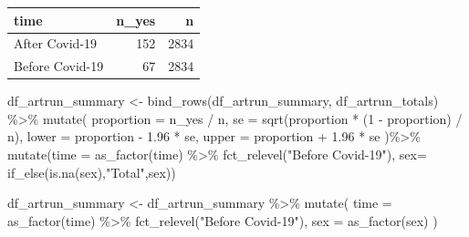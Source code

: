 \documentclass[
  letterpaper,
  DIV=11,
  numbers=noendperiod]{scrartcl}
\newenvironment{Shaded}{\begin{snugshade}}{\end{snugshade}}
\newcommand{\AttributeTok}[1]{\textcolor[rgb]{0.40,0.45,0.13}{#1}}
\newcommand{\DecValTok}[1]{\textcolor[rgb]{0.68,0.00,0.00}{#1}}
\newcommand{\FloatTok}[1]{\textcolor[rgb]{0.68,0.00,0.00}{#1}}
\newcommand{\FunctionTok}[1]{\textcolor[rgb]{0.28,0.35,0.67}{#1}}
\newcommand{\NormalTok}[1]{\textcolor[rgb]{0.00,0.23,0.31}{#1}}
\newcommand{\OtherTok}[1]{\textcolor[rgb]{0.00,0.23,0.31}{#1}}
\newcommand{\SpecialCharTok}[1]{\textcolor[rgb]{0.37,0.37,0.37}{#1}}
\newcommand{\StringTok}[1]{\textcolor[rgb]{0.13,0.47,0.30}{#1}}
\begin{document}
\begin{longtable}[]{@{}lrr@{}}
\toprule\noalign{}
time & n\_yes & n \\
\midrule\noalign{}
\endhead
\bottomrule\noalign{}
\endlastfoot
After Covid-19 & 152 & 2834 \\
Before Covid-19 & 67 & 2834 \\
\end{longtable}

\begin{Shaded}
\begin{Highlighting}[]
\NormalTok{df\_artrun\_summary }\OtherTok{\textless{}{-}} \FunctionTok{bind\_rows}\NormalTok{(df\_artrun\_summary, df\_artrun\_totals) }\SpecialCharTok{\%\textgreater{}\%}
  \FunctionTok{mutate}\NormalTok{(}
    \AttributeTok{proportion =}\NormalTok{ n\_yes }\SpecialCharTok{/}\NormalTok{ n,}
    \AttributeTok{se =} \FunctionTok{sqrt}\NormalTok{(proportion }\SpecialCharTok{*}\NormalTok{ (}\DecValTok{1} \SpecialCharTok{{-}}\NormalTok{ proportion) }\SpecialCharTok{/}\NormalTok{ n),}
    \AttributeTok{lower =}\NormalTok{ proportion }\SpecialCharTok{{-}} \FloatTok{1.96} \SpecialCharTok{*}\NormalTok{ se,}
    \AttributeTok{upper =}\NormalTok{ proportion }\SpecialCharTok{+} \FloatTok{1.96} \SpecialCharTok{*}\NormalTok{ se}
\NormalTok{  )}\SpecialCharTok{\%\textgreater{}\%} 
  \FunctionTok{mutate}\NormalTok{(}\AttributeTok{time =} \FunctionTok{as\_factor}\NormalTok{(time) }\SpecialCharTok{\%\textgreater{}\%} 
           \FunctionTok{fct\_relevel}\NormalTok{(}\StringTok{"Before Covid{-}19"}\NormalTok{),}
        \AttributeTok{sex=} \FunctionTok{if\_else}\NormalTok{(}\FunctionTok{is.na}\NormalTok{(sex),}\StringTok{"Total"}\NormalTok{,sex))}


\NormalTok{df\_artrun\_summary }\OtherTok{\textless{}{-}}\NormalTok{  df\_artrun\_summary }\SpecialCharTok{\%\textgreater{}\%} 
  \FunctionTok{mutate}\NormalTok{(}
    \AttributeTok{time =} \FunctionTok{as\_factor}\NormalTok{(time) }\SpecialCharTok{\%\textgreater{}\%} 
      \FunctionTok{fct\_relevel}\NormalTok{(}\StringTok{"Before Covid{-}19"}\NormalTok{),}
    \AttributeTok{sex =} \FunctionTok{as\_factor}\NormalTok{(sex)}
\NormalTok{  )}
\end{Highlighting}
\end{Shaded}
\end{document}
